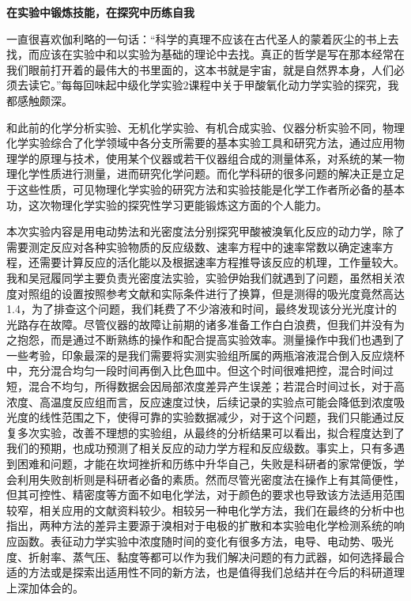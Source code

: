 \documentclass[%
preprint,
 amsmath,amssymb,
 aps,
10.5pt,
]{revtex4-1}
\newcommand{\xiaosan}{\fontsize{15pt}{22pt}\selectfont}    %
\newcommand{\xiaosi}{\fontsize{12pt}{18pt}\selectfont}
\begin{document}
\newpage
\begin{center}
\xiaosan\textbf{在实验中锻炼技能，在探究中历练自我}

\xiaosi{秦宇轩（3160103768）}
\end{center}

一直很喜欢伽利略的一句话：“科学的真理不应该在古代圣人的蒙着灰尘的书上去找，而应该在实验中和以实验为基础的理论中去找。真正的哲学是写在那本经常在我们眼前打开着的最伟大的书里面的，这本书就是宇宙，就是自然界本身，人们必须去读它。”每每回味起中级化学实验2课程中关于甲酸氧化动力学实验的探究，我都感触颇深。

和此前的化学分析实验、无机化学实验、有机合成实验、仪器分析实验不同，物理化学实验综合了化学领域中各分支所需要的基本实验工具和研究方法，通过应用物理学的原理与技术，使用某个仪器或若干仪器组合成的测量体系，对系统的某一物理化学性质进行测量，进而研究化学问题。而化学科研的很多问题的解决正是立足于这些性质，可见物理化学实验的研究方法和实验技能是化学工作者所必备的基本功，这次物理化学实验的探究性学习更能锻炼这方面的个人能力。  

本次实验内容是用电动势法和光密度法分别探究甲酸被溴氧化反应的动力学，除了需要测定反应对各种实验物质的反应级数、速率方程中的速率常数以确定速率方程，还需要计算反应的活化能以及根据速率方程推导该反应的机理，工作量较大。我和吴冠履同学主要负责光密度法实验，实验伊始我们就遇到了问题，虽然相关浓度对照组的设置按照参考文献和实际条件进行了换算，但是测得的吸光度竟然高达1.4，为了排查这个问题，我们耗费了不少溶液和时间，最终发现该分光光度计的光路存在故障。尽管仪器的故障让前期的诸多准备工作白白浪费，但我们并没有为之抱怨，而是通过不断熟练的操作和配合提高实验效率。测量操作中我们也遇到了一些考验，印象最深的是我们需要将实测实验组所属的两瓶溶液混合倒入反应烧杯中，充分混合均匀一段时间再倒入比色皿中。但这个时间很难把控，混合时间过短，混合不均匀，所得数据会因局部浓度差异产生误差；若混合时间过长，对于高浓度、高温度反应组而言，反应速度过快，后续记录的实验点可能会降低到浓度吸光度的线性范围之下，使得可靠的实验数据减少，对于这个问题，我们只能通过反复多次实验，改善不理想的实验组，从最终的分析结果可以看出，拟合程度达到了我们的预期，也成功预测了相关反应的动力学方程和反应级数。事实上，只有多遇到困难和问题，才能在坎坷挫折和历练中升华自己，失败是科研者的家常便饭，学会利用失败剖析则是科研者必备的素质。然而尽管光密度法在操作上有其简便性，但其可控性、精密度等方面不如电化学法，对于颜色的要求也导致该方法适用范围较窄，相关应用的文献资料较少。相较另一种电化学方法，我们在最终的分析中也指出，两种方法的差异主要源于溴相对于电极的扩散和本实验电化学检测系统的响应函数。表征动力学实验中浓度随时间的变化有很多方法，电导、电动势、吸光度、折射率、蒸气压、黏度等都可以作为我们解决问题的有力武器，如何选择最合适的方法或是探索出适用性不同的新方法，也是值得我们总结并在今后的科研道理上深加体会的。
\end{document}
